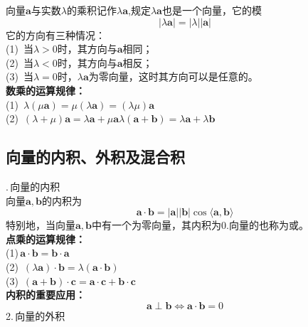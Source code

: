 \vspace*{-1em} \vspace*{-1em}
向量$\boldsymbol{a}$与实数$\lambda$的乘积记作$\lambda\boldsymbol{a}$,规定$\lambda\boldsymbol{a}$也是一个向量，它的模
\begin{equation}
	|\lambda\boldsymbol{a}|=|\lambda||\boldsymbol{a}|
\end{equation}
它的方向有三种情况：\\
(1)$\,$ 当$\lambda>0$时，其方向与$\boldsymbol{a}$相同；\\
(2)$\,$ 当$\lambda<0$时，其方向与$\boldsymbol{a}$相反；\\
(3)$\,$ 当$\lambda=0$时，$\lambda\boldsymbol{a}$为零向量，这时其方向可以是任意的。\\
\textbf{数乘的运算规律：}\\
(1)$\,$  \qquad
$\lambda(\mu\boldsymbol{a})=\mu(\lambda\boldsymbol{a})=(\lambda\mu)\boldsymbol{a}$\\
(2)$\,$  \qquad
$(\lambda+\mu)\boldsymbol{a}=\lambda\boldsymbol{a}+\mu \boldsymbol{a}$\qquad $\lambda(\boldsymbol{a}+\boldsymbol{b})=\lambda\boldsymbol{a}+\lambda\boldsymbol{b}$
\subsection{向量的内积、外积及混合积}
.$\,$向量的内积\\

\vspace*{-1em}\vspace*{-1em}
向量$\boldsymbol{a},\boldsymbol{b}$的内积为
\begin{equation}
	\boldsymbol{a}\cdot\boldsymbol{b}=|\boldsymbol{a}||\boldsymbol{b}|\cos\langle\boldsymbol{a},\boldsymbol{b}\rangle
\end{equation}
特别地，当向量$\boldsymbol{a},\boldsymbol{b}$中有一个为零向量，其内积为0.向量的也称为或。\\
\textbf{点乘的运算规律：}\\
(1)$\,$\qquad $\boldsymbol{a}\cdot\boldsymbol{b}=\boldsymbol{b}\cdot\boldsymbol{a}$\\
(2)$\,$\qquad
$(\lambda\boldsymbol{a})\cdot\boldsymbol{b}=\lambda(\boldsymbol{a}\cdot\boldsymbol{b})$\\
(3)$\,$\qquad
$(\boldsymbol{a}+\boldsymbol{b})\cdot\boldsymbol{c}=\boldsymbol{a}\cdot\boldsymbol{c}+\boldsymbol{b}\cdot\boldsymbol{c}$\\
\textbf{内积的重要应用：}
\begin{equation}
	\boldsymbol{a}\perp\boldsymbol{b}\Leftrightarrow \boldsymbol{a}\cdot\boldsymbol{b}=0 
\end{equation}
2.$\,$向量的外积\\

